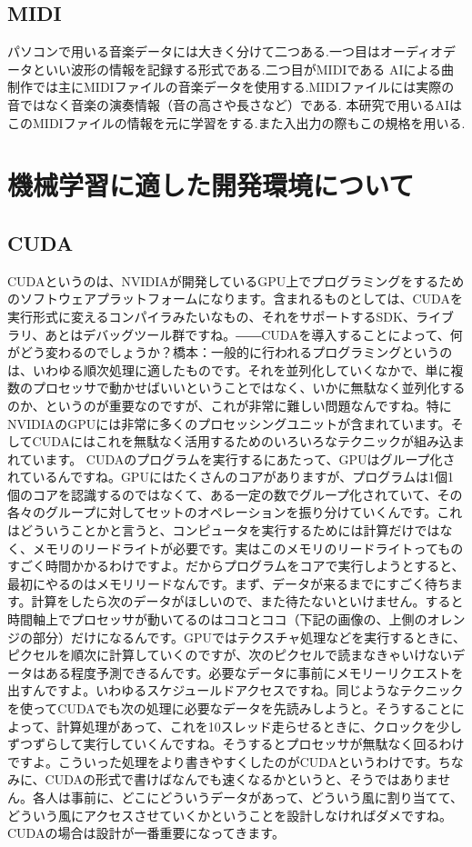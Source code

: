 \subsection{MIDI}
パソコンで用いる音楽データには大きく分けて二つある.一つ目はオーディオデータといい波形の情報を記録する形式である.二つ目がMIDIである
AIによる曲制作では主にMIDIファイルの音楽データを使用する.MIDIファイルには実際の音ではなく音楽の演奏情報（音の高さや長さなど）である.
本研究で用いるAIはこのMIDIファイルの情報を元に学習をする.また入出力の際もこの規格を用いる.
\section{機械学習に適した開発環境について}
\subsection{CUDA}
CUDAというのは、NVIDIAが開発しているGPU上でプログラミングをするためのソフトウェアプラットフォームになります。含まれるものとしては、CUDAを実行形式に変えるコンパイラみたいなもの、それをサポートするSDK、ライブラリ、あとはデバッグツール群ですね。――CUDAを導入することによって、何がどう変わるのでしょうか？橋本：一般的に行われるプログラミングというのは、いわゆる順次処理に適したものです。それを並列化していくなかで、単に複数のプロセッサで動かせばいいということではなく、いかに無駄なく並列化するのか、というのが重要なのですが、これが非常に難しい問題なんですね。特にNVIDIAのGPUには非常に多くのプロセッシングユニットが含まれています。そしてCUDAにはこれを無駄なく活用するためのいろいろなテクニックが組み込まれています。
CUDAのプログラムを実行するにあたって、GPUはグループ化されているんですね。GPUにはたくさんのコアがありますが、プログラムは1個1個のコアを認識するのではなくて、ある一定の数でグループ化されていて、その各々のグループに対してセットのオペレーションを振り分けていくんです。これはどういうことかと言うと、コンピュータを実行するためには計算だけではなく、メモリのリードライトが必要です。実はこのメモリのリードライトってものすごく時間かかるわけですよ。だからプログラムをコアで実行しようとすると、最初にやるのはメモリリードなんです。まず、データが来るまでにすごく待ちます。計算をしたら次のデータがほしいので、また待たないといけません。すると時間軸上でプロセッサが動いてるのはココとココ（下記の画像の、上側のオレンジの部分）だけになるんです。GPUではテクスチャ処理などを実行するときに、ピクセルを順次に計算していくのですが、次のピクセルで読まなきゃいけないデータはある程度予測できるんです。必要なデータに事前にメモリーリクエストを出すんですよ。いわゆるスケジュールドアクセスですね。同じようなテクニックを使ってCUDAでも次の処理に必要なデータを先読みしようと。そうすることによって、計算処理があって、これを10スレッド走らせるときに、クロックを少しずつずらして実行していくんですね。そうするとプロセッサが無駄なく回るわけですよ。こういった処理をより書きやすくしたのがCUDAというわけです。ちなみに、CUDAの形式で書けばなんでも速くなるかというと、そうではありません。各人は事前に、どこにどういうデータがあって、どういう風に割り当てて、どういう風にアクセスさせていくかということを設計しなければダメですね。CUDAの場合は設計が一番重要になってきます。
\newpage

